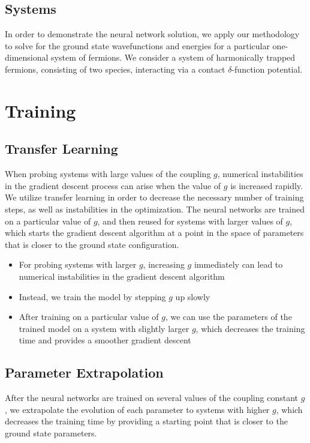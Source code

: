 \documentclass
[amsmath,10pt,aps,preprintnumbers,onecolumn,groupedaddress,superscriptaddress,notitlepage,nofootinbib,prd]{revtex4-1}
\begin{document}
\subsection{Systems}
In order to demonstrate the neural network solution, we apply our methodology to solve for the ground state wavefunctions and energies for a particular one-dimensional
system of fermions. We consider a system of harmonically trapped fermions, consisting of two species, interacting via a contact $\delta$-function potential. 


\section{Training}
\subsection{Transfer Learning}
When probing systems with large values of the coupling $g$, numerical instabilities in the gradient descent process can arise when the value of $g$ is increased rapidly. 
We utilize transfer learning in order to decrease the necessary number of training steps, as well as instabilities in the optimization. The neural networks are trained on a
particular value of $g$, and then reused for systems with larger values of  $g$, which starts the gradient descent algorithm at a point in the space of parameters that is closer
to the ground state configuration. 

\begin{itemize}
    \item For probing systems with larger $g$, increasing $g$ immediately can lead to numerical instabilities in the gradient descent algorithm
    \item Instead, we train the model by stepping $g$ up slowly
    \item After training on a particular value of $g$, we can use the parameters of the trained model on a system with slightly larger $g$, which decreases the training time and provides a smoother gradient descent
\end{itemize}
\subsection{Parameter Extrapolation}
After the neural networks are trained on several values of the coupling constant $g$, we extrapolate the evolution of each parameter to systems with higher $g$, which decreases the training time by providing a starting point that is closer to the ground state parameters.
\end{document}
